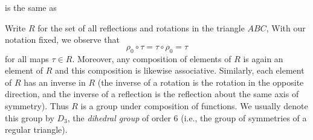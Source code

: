 \begin{example}
\begin{center}
    \end{center}
    is the same as
    \begin{center}
    \end{center}

    Write \(R\) for the set of all reflections and rotations in the triangle
    \(ABC\), With our notation fixed, we observe that
    \[\rho_0 \circ \tau = \tau \circ \rho_0 = \tau\] for all maps \(\tau \in
    R\). Moreover, any composition of elements of \(R\) is again an element of
    \(R\) and this composition is likewise associative. Similarly, each element
    of \(R\) has an inverse in \(R\) (the inverse of a rotation is the rotation
    in the opposite direction, and the inverse of a reflection is the reflection
    about the same axis of symmetry). Thus \(R\) is a group under composition of
    functions. We usually denote this group by \(D_3\), the \emph{dihedral
    group} of order \(6\) (i.e., the group of symmetries of a regular triangle).


\end{example}
